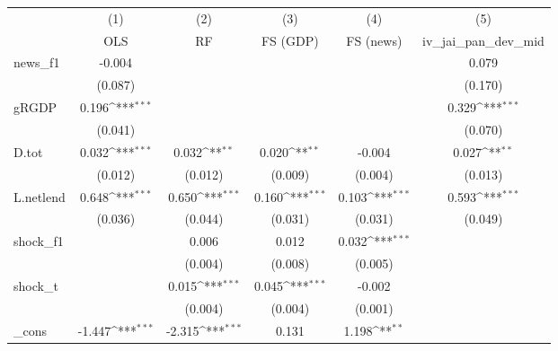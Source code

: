 {
\def\sym#1{\ifmmode^{#1}\else\(^{#1}\)\fi}
\begin{tabular}{l*{5}{c}}
\toprule
            &\multicolumn{1}{c}{(1)}&\multicolumn{1}{c}{(2)}&\multicolumn{1}{c}{(3)}&\multicolumn{1}{c}{(4)}&\multicolumn{1}{c}{(5)}\\
            &\multicolumn{1}{c}{OLS}&\multicolumn{1}{c}{RF}&\multicolumn{1}{c}{FS (GDP)}&\multicolumn{1}{c}{FS (news)}&\multicolumn{1}{c}{iv\_jai\_pan\_dev\_mid}\\
\midrule
news\_f1     &      -0.004         &                     &                     &                     &       0.079         \\
            &     (0.087)         &                     &                     &                     &     (0.170)         \\
\addlinespace
gRGDP       &       0.196\sym{***}&                     &                     &                     &       0.329\sym{***}\\
            &     (0.041)         &                     &                     &                     &     (0.070)         \\
\addlinespace
D.tot       &       0.032\sym{***}&       0.032\sym{**} &       0.020\sym{**} &      -0.004         &       0.027\sym{**} \\
            &     (0.012)         &     (0.012)         &     (0.009)         &     (0.004)         &     (0.013)         \\
\addlinespace
L.netlend   &       0.648\sym{***}&       0.650\sym{***}&       0.160\sym{***}&       0.103\sym{***}&       0.593\sym{***}\\
            &     (0.036)         &     (0.044)         &     (0.031)         &     (0.031)         &     (0.049)         \\
\addlinespace
shock\_f1    &                     &       0.006         &       0.012         &       0.032\sym{***}&                     \\
            &                     &     (0.004)         &     (0.008)         &     (0.005)         &                     \\
\addlinespace
shock\_t     &                     &       0.015\sym{***}&       0.045\sym{***}&      -0.002         &                     \\
            &                     &     (0.004)         &     (0.004)         &     (0.001)         &                     \\
\addlinespace
\_cons      &      -1.447\sym{***}&      -2.315\sym{***}&       0.131         &       1.198\sym{**} &                     \\

\end{tabular}}
